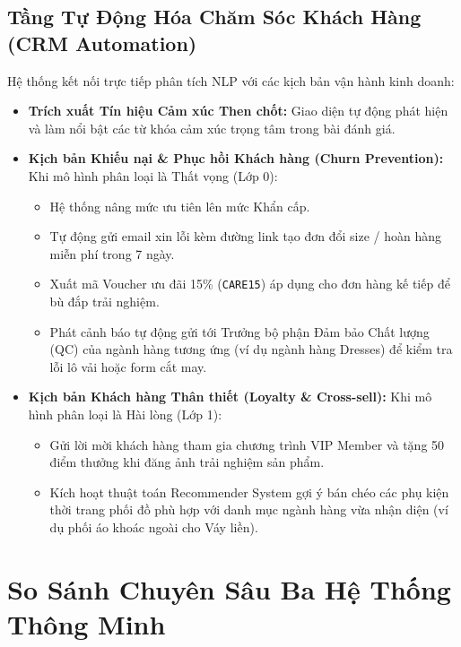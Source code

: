 \documentclass[12pt,a4paper]{report}
\begin{document}
\section{Tầng Tự Động Hóa Chăm Sóc Khách Hàng (CRM Automation)}
Hệ thống kết nối trực tiếp phân tích NLP với các kịch bản vận hành kinh doanh:
\begin{itemize}[leftmargin=2em]
    \item \textbf{Trích xuất Tín hiệu Cảm xúc Then chốt:} Giao diện tự động phát hiện và làm nổi bật các từ khóa cảm xúc trọng tâm trong bài đánh giá.
    \item \textbf{Kịch bản Khiếu nại \& Phục hồi Khách hàng (Churn Prevention):}
    Khi mô hình phân loại là Thất vọng (Lớp 0):
    \begin{itemize}
        \item Hệ thống nâng mức ưu tiên lên mức Khẩn cấp.
        \item Tự động gửi email xin lỗi kèm đường link tạo đơn đổi size / hoàn hàng miễn phí trong 7 ngày.
        \item Xuất mã Voucher ưu đãi 15\% (\texttt{CARE15}) áp dụng cho đơn hàng kế tiếp để bù đắp trải nghiệm.
        \item Phát cảnh báo tự động gửi tới Trưởng bộ phận Đảm bảo Chất lượng (QC) của ngành hàng tương ứng (ví dụ ngành hàng Dresses) để kiểm tra lỗi lô vải hoặc form cắt may.
    \end{itemize}
    \item \textbf{Kịch bản Khách hàng Thân thiết (Loyalty \& Cross-sell):}
    Khi mô hình phân loại là Hài lòng (Lớp 1):
    \begin{itemize}
        \item Gửi lời mời khách hàng tham gia chương trình VIP Member và tặng 50 điểm thưởng khi đăng ảnh trải nghiệm sản phẩm.
        \item Kích hoạt thuật toán Recommender System gợi ý bán chéo các phụ kiện thời trang phối đồ phù hợp với danh mục ngành hàng vừa nhận diện (ví dụ phối áo khoác ngoài cho Váy liền).
    \end{itemize}
\end{itemize}

\chapter{So Sánh Chuyên Sâu Ba Hệ Thống Thông Minh}
\end{document}
